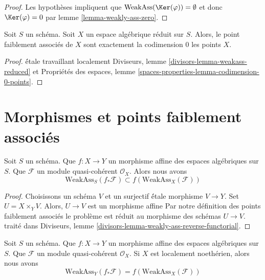 \begin{proof}
Les hypothèses impliquent que $\text{WeakAss}(\Ker(\varphi)) = \emptyset$
et donc $\Ker(\varphi) = 0$ par lemme \ref{lemma-weakly-ass-zero}.
\end{proof}

\begin{lemma}
\label{lemma-weakass-reduced}
Soit $S$ un schéma. Soit $X$ un espace algébrique réduit sur $S$.
Alors, le point faiblement associés de $X$ sont exactement la codimension $0$
les points $X$.
\end{lemma}

\begin{proof}
\'étale travaillant localement
Diviseurs, lemme \ref{divisors-lemma-weakass-reduced}
et
Propriétés des espaces, lemme \ref{spaces-properties-lemma-codimension-0-points}.
\end{proof}










\section{Morphismes et points faiblement associés}
\label{section-morphisms-weakly-associated}

\begin{lemma}
\label{lemma-weakly-ass-reverse-functorial}
Soit $S$ un schéma.
Que $f : X \to Y$ un morphisme affine des espaces algébriques sur $S$.
Que $\mathcal{F}$ un module quasi-cohérent $\mathcal{O}_X$.
Alors nous avons
$$
\text{WeakAss}_S(f_*\mathcal{F}) \subset f(\text{WeakAss}_X(\mathcal{F}))
$$
\end{lemma}

\begin{proof}
Choisissons un schéma $V$ et un surjectif \'étale morphisme $V \to Y$.
Set $U = X \times_Y V$. Alors, $U \to V$ est un morphisme affine
Par notre définition des points faiblement associés
le problème est réduit au morphisme des schémas $U \to V$.
traité dans Diviseurs, lemme \ref{divisors-lemma-weakly-ass-reverse-functorial}.
\end{proof}

\begin{lemma}
\label{lemma-ass-functorial-equal}
Soit $S$ un schéma.
Que $f : X \to Y$ un morphisme affine des espaces algébriques sur $S$.
Que $\mathcal{F}$ un module quasi-cohérent $\mathcal{O}_X$.
Si $X$ est localement noethérien, alors nous avons
$$
\text{WeakAss}_Y(f_*\mathcal{F}) =
f(\text{WeakAss}_X(\mathcal{F}))
$$
\end{lemma}

